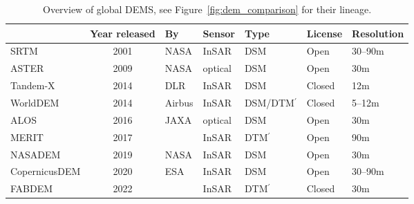 \begin{table}[]
  \begin{tabular}{@{}lclllll@{}}
    \toprule
                  & Year released & By                 & Sensor  & Type               & License & Resolution \\
    \midrule
    SRTM          & 2001          & NASA               & InSAR   & DSM                & Open    & 30--90m    \\
    ASTER         & 2009          & NASA               & optical & DSM                & Open    & 30m        \\
    Tandem-X      & 2014          & DLR                & InSAR   & DSM                & Closed  & 12m        \\
    WorldDEM      & 2014          & Airbus             & InSAR   & DSM/DTM$^{\prime}$ & Closed  & 5--12m     \\
    ALOS          & 2016          & JAXA               & optical & DSM                & Open    & 30m        \\
    MERIT         & 2017          & \citet{Yamazaki17} & InSAR   & DTM$^{\prime}$     & Open    & 90m        \\
    NASADEM       & 2019          & NASA               & InSAR   & DSM                & Open    & 30m        \\
    CopernicusDEM & 2020          & ESA                & InSAR   & DSM                & Open    & 30--90m    \\
    FABDEM        & 2022          & \citet{Hawker22}   & InSAR   & DTM$^{\prime}$     & Closed  & 30m        \\
    \bottomrule
  \end{tabular}
  \caption{Overview of global DEMS, see Figure~\ref{fig:dem_comparison} for their lineage.}%
  \label{tab:gdem_overview}
\end{table}


